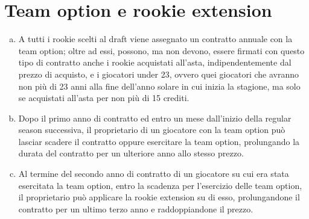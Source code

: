 \documentclass{article}
\begin{document}
\section{Team option e rookie extension}\label{Team option e rookie extension}
\begin{enumerate}[(a)]
\item A tutti i rookie scelti al draft viene assegnato un contratto annuale con la team option; oltre ad essi, possono, ma non devono, essere firmati con questo tipo di contratto anche i rookie acquistati all'asta, indipendentemente dal prezzo di acquisto, e i giocatori under 23, ovvero quei giocatori che avranno non più di 23 anni alla fine dell'anno solare in cui inizia la stagione, ma solo se acquistati all'asta per non più di 15 crediti.
\item Dopo il primo anno di contratto ed entro un mese dall'inizio della regular season successiva, il proprietario di un giocatore con la team option può lasciar scadere il contratto oppure esercitare la team option, prolungando la durata del contratto per un ulteriore anno allo stesso prezzo.
\item Al termine del secondo anno di contratto di un giocatore su cui era stata esercitata la team option, entro la scadenza per l'esercizio delle team option, il proprietario può applicare la rookie extension su di esso, prolungandone il contratto per un ultimo terzo anno e raddoppiandone il prezzo.
\end{enumerate}
\end{document}
